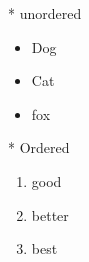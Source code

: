 * unordered
\begin{itemize}
	\item Dog
	\item Cat 
	\item fox 
\end{itemize}

* Ordered
\begin{enumerate}
	\item good
	\item better  
	\item best 
\end{enumerate}

